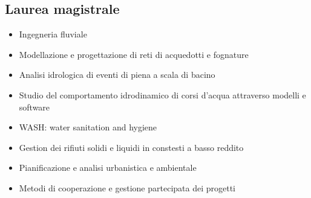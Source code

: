 \documentclass[12pt,a4paper,sans]{moderncv} %
\begin{document}
\subsection{Laurea magistrale}
\begin{itemize}
\item Ingegneria fluviale
\item Modellazione e progettazione di reti di acquedotti e fognature
\item Analisi idrologica di eventi di piena a scala di bacino 
\item Studio del comportamento idrodinamico di corsi d'acqua attraverso modelli e software
\item WASH: water sanitation and hygiene
\item Gestion dei rifiuti solidi e liquidi in constesti a basso reddito
\item Pianificazione e analisi urbanistica e ambientale 
\item Metodi di cooperazione e gestione partecipata dei progetti
\end{itemize}
\medskip
\end{document}
